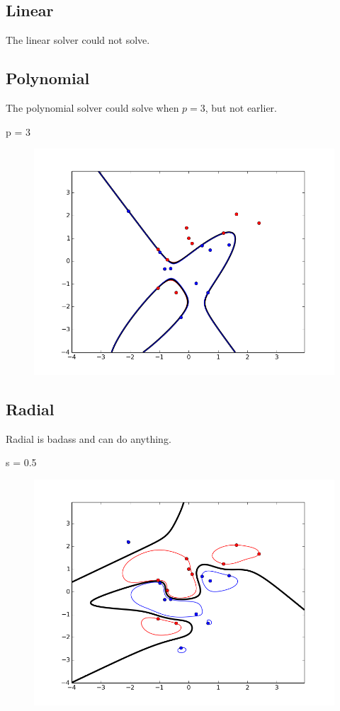 \documentclass{article}
\begin{document}
\subsection{Linear}
The linear solver could not solve.

\subsection{Polynomial}
The polynomial solver could solve when $p=3$, but not earlier.

p = 3
\begin{figure}[H]
    \centering
    \includegraphics[width=1.0\linewidth]{../img/poly_s1_hard_p3.png}
\end{figure}

\subsection{Radial}
Radial is badass and can do anything.

s = 0.5 
\begin{figure}[H]
    \centering
    \includegraphics[width=1.0\linewidth]{../img/radial_s1_hard_s05.png}
\end{figure}
\end{document}
